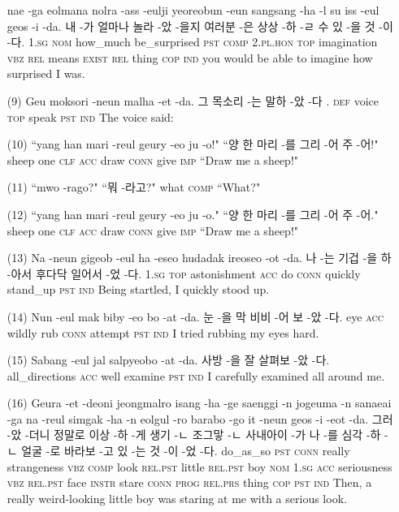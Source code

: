 \begin{itemize}
\tgl
		{nae -ga eolmana nolra -ass -eulji yeoreobun -eun sangsang -ha -l su iss -eul geos -i -da.}
		{내 -가 얼마나 놀라 -았 -을지 여러분 -은 상상 -하 -ㄹ 수 있 -을 것 -이 -다.}
		{\textsc{1.sg}	\textsc{nom}	how\_much	be\_surprised	\textsc{pst}	\textsc{comp}	\textsc{2.pl.hon}	\textsc{top}	imagination	\textsc{vbz}	\textsc{rel}	means	\textsc{exist}	\textsc{rel}	thing	\textsc{cop}	\textsc{ind}}
		{you would be able to imagine how surprised I was.}
		

\item [(9)]
\tgl
		{Geu moksori -neun malha -et -da.}
		{그 목소리 -는 말하 -았 -다 .}
		{\textsc{def}	voice	\textsc{top}	speak	\textsc{pst}	\textsc{ind}}
		{The voice said:}
		
\item [(10)]
\tgl
		{``yang han mari -reul geury -eo ju -o!"}
		{``양 한 마리 -를 그리 -어 주 -어!"}
		{sheep	one	\textsc{clf}	\textsc{acc}	draw	\textsc{conn}	give	\textsc{imp}}
		{``Draw me a sheep!"}

\item [(11)]
\tgl
		{``mwo -rago?"}
		{``뭐 -라고?"}
		{what	\textsc{comp}}
		{``What?"}
		
\item [(12)]
\tgl
		{``yang han mari -reul geury -eo ju -o."}
		{``양 한 마리 -를 그리 -어 주 -어."}
		{sheep	one	\textsc{clf}	\textsc{acc}	draw	\textsc{conn}	give	\textsc{imp}}
		{``Draw me a sheep!"}
		
\item [(13)]
\tgl
		{Na -neun gigeob -eul ha -eseo hudadak ireoseo -ot -da.}
		{나 -는 기겁 -을 하 -아서 후다닥 일어서 -었 -다.}
		{\textsc{1.sg}	\textsc{top}	astonishment	\textsc{acc}	do	\textsc{conn}	quickly	stand\_up	\textsc{pst}	\textsc{ind}}
		{Being startled, I quickly stood up.}
		
\item [(14)]
\tgl
		{Nun -eul mak biby -eo bo -at -da.}
		{눈 -을 막 비비 -어 보 -았 -다.}
		{eye	\textsc{acc}	wildly	rub	\textsc{conn}	attempt	\textsc{pst}	\textsc{ind}}
		{I tried rubbing my eyes hard.}
		
\item [(15)]
\tgl
		{Sabang -eul jal salpyeobo -at -da.}
		{사방 -을 잘 살펴보 -았 -다.}
		{all\_directions	\textsc{acc}	well	examine	\textsc{pst}	\textsc{ind}}
		{I carefully examined all around me.}
		
\item [(16)]
\tgl
		{Geura -et -deoni jeongmalro isang -ha -ge saenggi -n jogeuma -n sanaeai -ga na -reul simgak -ha -n eolgul -ro barabo -go it -neun geos -i -eot -da.}
		{그러 -았 -더니 정말로 이상 -하 -게 생기 -ㄴ 조그맣 -ㄴ 사내아이 -가 나 -를 심각 -하 -ㄴ 얼굴 -로 바라보 -고 있 -는 것 -이 -었 -다.}
		{do\_as\_so	\textsc{pst}	\textsc{conn}	really	strangeness	\textsc{vbz}	\textsc{comp}	look	\textsc{rel.pst}	little	\textsc{rel.pst}	boy	\textsc{nom}	\textsc{1.sg}	\textsc{acc}	seriousness	\textsc{vbz}	\textsc{rel.pst}	face	\textsc{instr}	stare	\textsc{conn}	\textsc{prog}	\textsc{rel.prs}	thing	\textsc{cop}	\textsc{pst}	\textsc{ind}}
		{Then, a really weird-looking little boy was staring at me with a serious look.}
		

\end{itemize}
